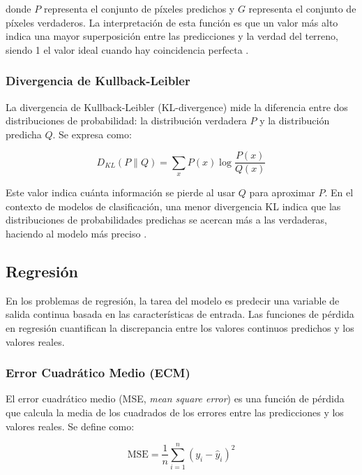 donde \(P\) representa el conjunto de píxeles predichos y \(G\) representa el conjunto de píxeles verdaderos. La interpretación de esta función es que un valor más alto indica una mayor superposición entre las predicciones y la verdad del terreno, siendo 1 el valor ideal cuando hay coincidencia perfecta \cite{pajares2021aprendizaje}.

\subsubsection{Divergencia de Kullback-Leibler}

La divergencia de Kullback-Leibler (KL-divergence) mide la diferencia entre dos distribuciones de probabilidad: la distribución verdadera \(P\) y la distribución predicha \(Q\). Se expresa como:

\begin{equation}
    D_{KL}(P \| Q) = \sum_{x} P(x) \log \frac{P(x)}{Q(x)}
\end{equation}

Este valor indica cuánta información se pierde al usar \(Q\) para aproximar \(P\). En el contexto de modelos de clasificación, una menor divergencia KL indica que las distribuciones de probabilidades predichas se acercan más a las verdaderas, haciendo al modelo más preciso \cite{pajares2021aprendizaje}.

\subsection{Regresión}

En los problemas de regresión, la tarea del modelo es predecir una variable de salida continua basada en las características de entrada. Las funciones de pérdida en regresión cuantifican la discrepancia entre los valores continuos predichos y los valores reales.

\subsubsection{Error Cuadrático Medio (ECM)}

El error cuadrático medio (MSE, \textit{mean square error}) es una función de pérdida que calcula la media de los cuadrados de los errores entre las predicciones y los valores reales. Se define como:

\begin{equation}
    \text{MSE} = \frac{1}{n} \sum_{i=1}^{n} (y_i - \hat{y}_i)^2
\end{equation}

